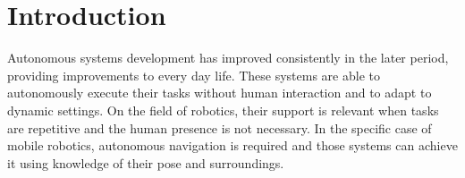 

\chapter{Introduction}
\label{ch:introduction}









\noindent 
Autonomous systems development has improved consistently in the later period, providing improvements to every day life.
These systems are able to autonomously execute their tasks without human interaction and to adapt to dynamic settings.
On the field of robotics, their support is relevant when tasks are repetitive and the human presence is not necessary.
In the specific case of mobile robotics, autonomous navigation is required and those systems can achieve it using knowledge of their pose and surroundings.

